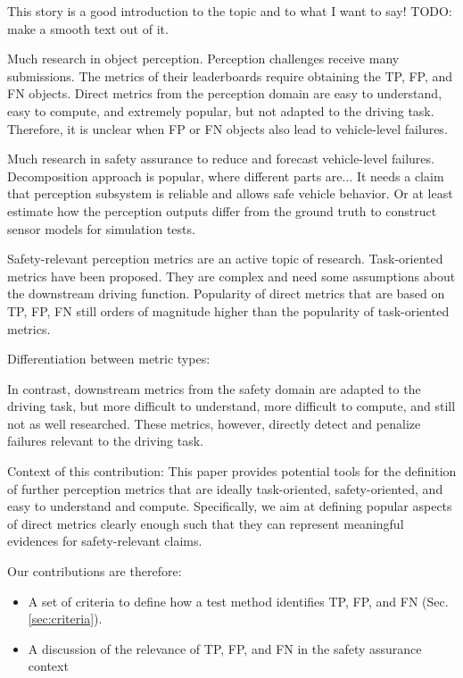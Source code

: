 \documentclass[conference]{IEEEtran}
\begin{document}

This story is a good introduction to the topic and to what I want to say! 
TODO: make a smooth text out of it.

Much research in object perception. 
Perception challenges receive many submissions. 
The metrics of their leaderboards require obtaining the TP, FP, and FN objects. 
Direct metrics from the perception domain are easy to understand, easy to compute, and extremely popular, but not adapted to the driving task. 
Therefore, it is unclear when FP or FN objects also lead to vehicle-level failures. 

Much research in safety assurance to reduce and forecast vehicle-level failures.
Decomposition approach is popular, where different parts are... It needs a claim that perception subsystem is reliable and allows safe vehicle behavior. Or at least estimate how the perception outputs differ from the ground truth to construct sensor models for simulation tests.

Safety-relevant perception metrics are an active topic of research. 
Task-oriented metrics have been proposed. 
They are complex and need some assumptions about the downstream driving function. 
Popularity of direct metrics that are based on TP, FP, FN still orders of magnitude higher than the popularity of task-oriented metrics. 

Differentiation between metric types:

In contrast, downstream metrics from the safety domain are adapted to the driving task, but more difficult to understand, more difficult to compute, and still not as well researched. 
These metrics, however, directly detect and penalize failures relevant to the driving task. 

Context of this contribution:
This paper provides potential tools for the definition of further perception metrics that are ideally task-oriented, safety-oriented, and easy to understand and compute. 
Specifically, we aim at defining popular aspects of direct metrics clearly enough such that they can represent meaningful evidences for safety-relevant claims.  

Our contributions are therefore:
\begin{itemize}
\item A set of criteria to define how a test method identifies TP, FP, and FN (Sec. \ref{sec:criteria}).
\item A discussion of the relevance of TP, FP, and FN in the safety assurance context
\end{itemize}
\end{document}
